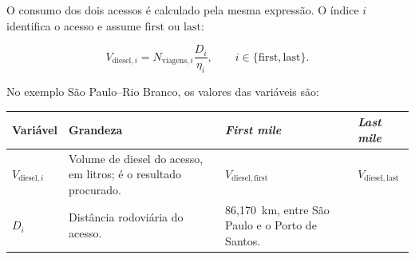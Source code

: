 \documentclass[brazil,]{article}
\newcommand{\keeptable}{\Needspace{0.64\textheight}}
\begin{document}
O consumo dos dois acessos é calculado pela mesma expressão. O índice
\(i\) identifica o acesso e assume \(\mathrm{first}\) ou
\(\mathrm{last}\):

\[
V_{\mathrm{diesel},i}
=N_{\mathrm{viagens},i}
\frac{D_i}{\eta_i},
\qquad
i\in\{\mathrm{first},\mathrm{last}\}.
\]

\keeptable
No exemplo São Paulo--Rio Branco, os valores das variáveis são:

\begin{longtable}[]{@{}llll@{}}
\toprule
\begin{minipage}[b]{0.16\columnwidth}\raggedright
Variável\strut
\end{minipage} & \begin{minipage}[b]{0.27\columnwidth}\raggedright
Grandeza\strut
\end{minipage} & \begin{minipage}[b]{0.24\columnwidth}\raggedright
\emph{First mile}\strut
\end{minipage} & \begin{minipage}[b]{0.24\columnwidth}\raggedright
\emph{Last mile}\strut
\end{minipage}\tabularnewline
\midrule
\endhead
\begin{minipage}[t]{0.16\columnwidth}\raggedright
\(V_{\mathrm{diesel},i}\)\strut
\end{minipage} & \begin{minipage}[t]{0.27\columnwidth}\raggedright
Volume de diesel do acesso, em litros; é o resultado procurado.\strut
\end{minipage} & \begin{minipage}[t]{0.24\columnwidth}\raggedright
\(V_{\mathrm{diesel,first}}\)\strut
\end{minipage} & \begin{minipage}[t]{0.24\columnwidth}\raggedright
\(V_{\mathrm{diesel,last}}\)\strut
\end{minipage}\tabularnewline
\begin{minipage}[t]{0.16\columnwidth}\raggedright
\(D_i\)\strut
\end{minipage} & \begin{minipage}[t]{0.27\columnwidth}\raggedright
Distância rodoviária do acesso.\strut
\end{minipage} & \begin{minipage}[t]{0.24\columnwidth}\raggedright
86,170~km, entre São Paulo e o Porto de Santos.\strut
\end{minipage} & \begin{minipage}[t]{0.24\columnwidth}\raggedright

\end{minipage}
\end{longtable}
\end{document}
